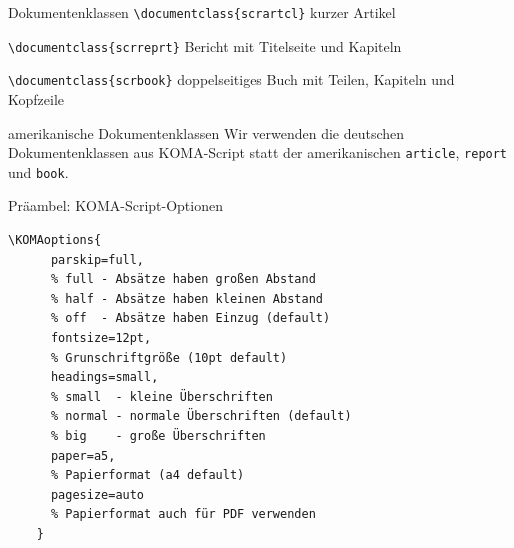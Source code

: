 \begin{Frame}[fragile]{Dokumentenklassen}
  \lstinline-\documentclass{scrartcl}-\newline
  kurzer Artikel

  \xxx

  \lstinline-\documentclass{scrreprt}-\newline
  Bericht mit Titelseite und Kapiteln

  \xxx

  \lstinline-\documentclass{scrbook}-\newline
  doppelseitiges Buch mit Teilen, Kapiteln und Kopfzeile

  \xxx

  \begin{alertblock}{amerikanische Dokumentenklassen}
    Wir verwenden die deutschen Dokumentenklassen aus KOMA-Script statt der 
    amerikanischen \lstinline-article-, \lstinline-report- und \lstinline-book-.
  \end{alertblock}
\end{Frame}

\begin{Frame}[fragile]{Präambel: KOMA-Script-Optionen}
  \begin{lstlisting}[gobble=4]
    \KOMAoptions{
      parskip=full,
      % full - Absätze haben großen Abstand
      % half - Absätze haben kleinen Abstand
      % off  - Absätze haben Einzug (default)
      fontsize=12pt,
      % Grunschriftgröße (10pt default)
      headings=small,
      % small  - kleine Überschriften
      % normal - normale Überschriften (default)
      % big    - große Überschriften
      paper=a5,
      % Papierformat (a4 default)
      pagesize=auto
      % Papierformat auch für PDF verwenden
    }
  \end{lstlisting}
\end{Frame}

